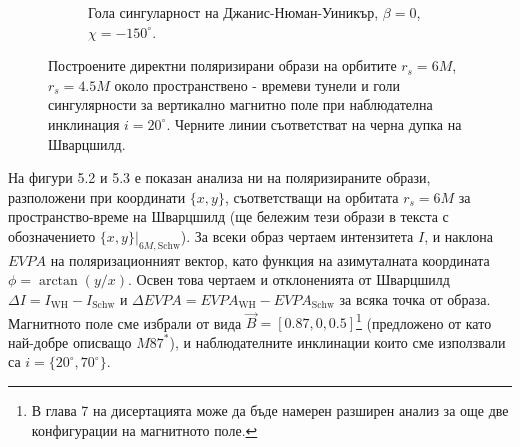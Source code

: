 \documentclass[12pt]{article}
\numberwithin{equation}{section}
\numberwithin{figure}{section}
\begin{document}
\begin{figure}[!htb]
\begin{subfigure}{7cm}
			\caption{Гола сингуларност на Джанис-Нюман-Уиникър, $\beta = 0$, $\chi = -150^\circ$.}
		\end{subfigure}
		\caption[Поляризирани директни образи около пространствено - времеви тунели и голи сингулярности за вертикално магнитно поле.]{\small Построените директни поляризирани образи на орбитите $r_s = 6M$, $r_s = 4.5M$ около пространствено - времеви тунели  и голи сингулярности за вертикално магнитно поле при наблюдателна инклинация $i = 20^\circ$. Черните линии съответстват на черна дупка на Шварцшилд.} 
		\label{pol_vert_field}
	\end{figure}
	
	На фигури 5.2 и 5.3 е показан анализа ни на поляризираните образи, разположени при координати $\{x,y\}$, съответстващи на орбитата $r_s = 6M$ за пространство-време на Шварцшилд (ще бележим тези образи в текста с обозначението $\{x,y\}\vert_{6M, \text{Schw}}$). За всеки образ чертаем интензитета $I$, и наклона $EVPA$ на поляризационният вектор, като функция на азимуталната координата $\phi = \arctan(y / x)$. Освен това чертаем и отклоненията от Шварцшилд $\Delta I = I_{\text{WH}} - I_{\text{Schw}}$ и $\Delta EVPA = EVPA_\text{WH} - EVPA_\text{Schw}$ за всяка точка от образа. Магнитното поле сме избрали от вида $\vec{B} = [0.87, 0, 0.5]$\footnote{В глава 7 на дисертацията може да бъде намерен разширен анализ за още две конфигурации на магнитното поле.} (предложено от \cite{Narayan2021} като най-добре описващо $M87^*$), и наблюдателните инклинации които сме използвали са $i = \{20^\circ, 70^\circ\}$.
	
	
	\newpage
	
\end{document}
